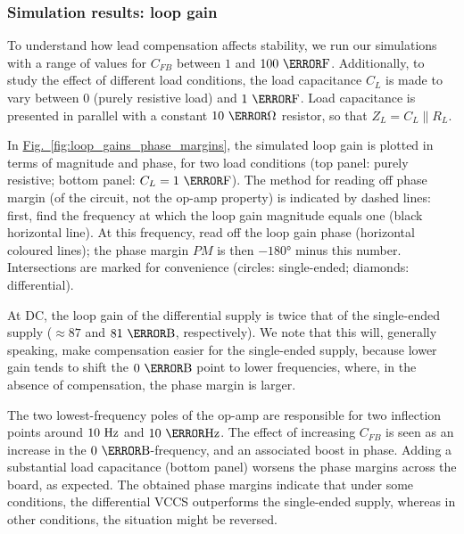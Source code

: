 \documentclass[10pt]{article}
\newcommand{\brieffiglink}[1]{\hyperref[#1]{Fig.~\ref*{#1}}}
\begin{document}
\subsubsection{Simulation results: loop gain}

To understand how lead compensation affects stability, we run our simulations with a range of values for $C_{FB}$ between $1$ and $100~\pico\farad$. Additionally, to study the effect of different load conditions, the load capacitance $C_L$ is made to vary between $0$ (purely resistive load) and $1~\micro\farad$. Load capacitance is presented in parallel with a constant $10~\kilo\ohm$ resistor, so that $Z_L= C_L\|R_L$.

In \brieffiglink{fig:loop_gains_phase_margins}, the simulated loop gain is plotted in terms of magnitude and phase, for two load conditions (top panel: purely resistive; bottom panel: $C_L=1~\micro\farad$). The method for reading off phase margin (of the circuit, not the op-amp property) is indicated by dashed lines: first, find the frequency at which the loop gain magnitude equals one (black horizontal line). At this frequency, read off the loop gain phase (horizontal coloured lines); the phase margin $PM$ is then $\ang{-180}$ minus this number. Intersections are marked for convenience (circles: single-ended; diamonds: differential).

At DC, the loop gain of the differential supply is twice that of the single-ended supply ($\approx87$ and $81~\deci\bel$, respectively). We note that this will, generally speaking, make compensation easier for the single-ended supply, because lower gain tends to shift the $0~\deci\bel$ point to lower frequencies, where, in the absence of compensation, the phase margin is larger.%

The two lowest-frequency poles of the op-amp are responsible for two inflection points around $10~\hertz$ and $10~\mega\hertz$. The effect of increasing $C_{FB}$ is seen as an increase in the $0~\deci\bel$-frequency, and an associated boost in phase. Adding a substantial load capacitance (bottom panel) worsens the phase margins across the board, as expected. The obtained phase margins indicate that under some conditions, the differential VCCS outperforms the single-ended supply, whereas in other conditions, the situation might be reversed.%
\end{document}
